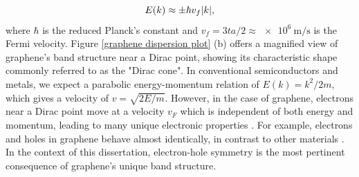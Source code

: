 \documentclass[double,12pt,1in,seploa]{beavtex}
\begin{document}
\begin{equation}
    E(k) \approx \pm \hbar v_f \abs{k}, \label{linear dispersion of graphene}
\end{equation}
where $\hbar$ is the reduced Planck's constant and $v_f = 3ta/2  \approx \SI{e6}{\meter/\second}$ is the Fermi velocity. Figure \ref{graphene dispersion plot} (b) offers a magnified view of graphene's band structure near a Dirac point, showing its characteristic shape commonly referred to as the "Dirac cone". In conventional semiconductors and metals, we expect a parabolic energy-momentum relation of $E(k) = k^2/2m$, which gives a velocity of $v = \sqrt{2E/m}$. However, in the case of graphene, electrons near a Dirac point move at a velocity $v_F$ which is independent of both energy and momentum, leading to many unique electronic properties \cite{castro_neto_electronic_2009}. For example, electrons and holes in graphene behave almost identically, in contrast to other materials \cite{novoselov_electronic_2007,castro_neto_electronic_2009}. In the context of this dissertation, electron-hole symmetry is the most pertinent consequence of graphene’s unique band structure.
\end{document}

